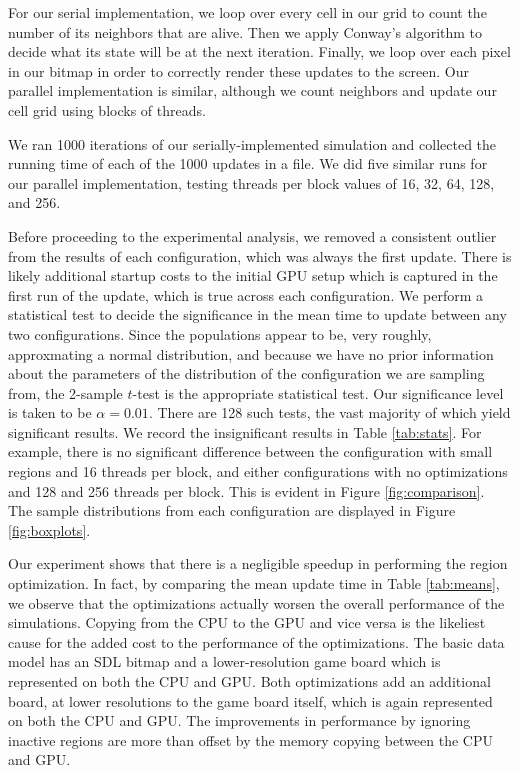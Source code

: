 \documentclass[onecolumn,12pt]{IEEEtran}
\begin{document}
  For our serial implementation, we loop over every cell in our grid to count the
  number of its neighbors that are alive. Then we apply Conway's algorithm to
  decide what its state will be at the next iteration. Finally, we loop over each
  pixel in our bitmap in order to correctly render these updates to the screen.
  Our parallel implementation is similar, although we count neighbors and update
  our cell grid using blocks of threads. 

  We ran 1000 iterations of our serially-implemented simulation and collected the
  running time of each of the 1000 updates in a file. We did five similar runs
  for our parallel implementation, testing threads per block values of 16, 32,
  64, 128, and 256.

  Before proceeding to the experimental analysis, we removed a consistent outlier
  from the results of each configuration, which was always the first update.
  There is likely additional startup costs to the initial GPU setup which is
  captured in the first run of the update, which is true across each
  configuration. We perform a statistical test to decide the significance in the
  mean time to update between any two configurations. Since the populations
  appear to be, very roughly, approxmating a normal distribution, and because we
  have no prior information about the parameters of the distribution of the
  configuration we are sampling from, the 2-sample $t$-test is the appropriate
  statistical test. Our significance level is taken to be $\alpha = 0.01$. There
  are 128 such tests, the vast majority of which yield significant results. We
  record the insignificant results in Table \ref{tab:stats}. For example, there
  is no significant difference between the configuration with small regions and
  16 threads per block, and either configurations with no optimizations and 128
  and 256 threads per block.  This is evident in Figure \ref{fig:comparison}. The
  sample distributions from each configuration are displayed in Figure
  \ref{fig:boxplots}.

  Our experiment shows that there is a negligible speedup in performing the
  region optimization. In fact, by comparing the mean update time in Table
  \ref{tab:means}, we observe that the optimizations actually worsen the overall
  performance of the simulations. Copying from the CPU to the GPU and vice versa
  is the likeliest cause for the added cost to the performance of the
  optimizations. The basic data model has an SDL bitmap and a lower-resolution
  game board which is represented on both the CPU and GPU.  Both optimizations
  add an additional board, at lower resolutions to the game board itself, which
  is again represented on both the CPU and GPU. The improvements in performance
  by ignoring inactive regions are more than offset by the memory copying between
  the CPU and GPU.
\end{document}
